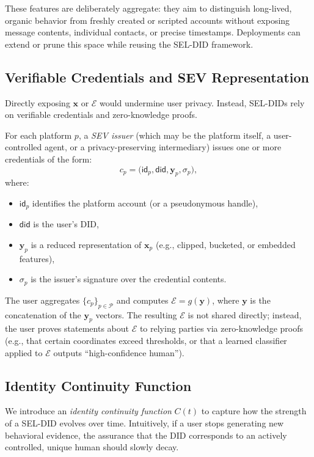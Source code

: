 \documentclass[11pt]{article}
\begin{document}
These features are deliberately aggregate: they aim to distinguish long-lived, organic behavior from freshly created or scripted accounts without exposing message contents, individual contacts, or precise timestamps. Deployments can extend or prune this space while reusing the SEL-DID framework.

\subsection{Verifiable Credentials and SEV Representation}

Directly exposing $\mathbf{x}$ or $\mathcal{E}$ would undermine user privacy. Instead, SEL-DIDs rely on verifiable credentials and zero-knowledge proofs.

For each platform $p$, a \emph{SEV issuer} (which may be the platform itself, a user-controlled agent, or a privacy-preserving intermediary) issues one or more credentials of the form:
\[
  c_{p} = \big( \mathsf{id}_p, \mathsf{did}, \mathbf{y}_p, \sigma_p \big),
\]
where:
\begin{itemize}
  \item $\mathsf{id}_p$ identifies the platform account (or a pseudonymous handle),
  \item $\mathsf{did}$ is the user's DID,
  \item $\mathbf{y}_p$ is a reduced representation of $\mathbf{x}_p$ (e.g., clipped, bucketed, or embedded features),
  \item $\sigma_p$ is the issuer's signature over the credential contents.
\end{itemize}

The user aggregates $\{c_p\}_{p \in \mathcal{P}}$ and computes $\mathcal{E} = g(\mathbf{y})$, where $\mathbf{y}$ is the concatenation of the $\mathbf{y}_p$ vectors. The resulting $\mathcal{E}$ is not shared directly; instead, the user proves statements about $\mathcal{E}$ to relying parties via zero-knowledge proofs (e.g., that certain coordinates exceed thresholds, or that a learned classifier applied to $\mathcal{E}$ outputs ``high-confidence human'').

\subsection{Identity Continuity Function}

We introduce an \emph{identity continuity function} $C(t)$ to capture how the strength of a SEL-DID evolves over time. Intuitively, if a user stops generating new behavioral evidence, the assurance that the DID corresponds to an actively controlled, unique human should slowly decay.
\end{document}
